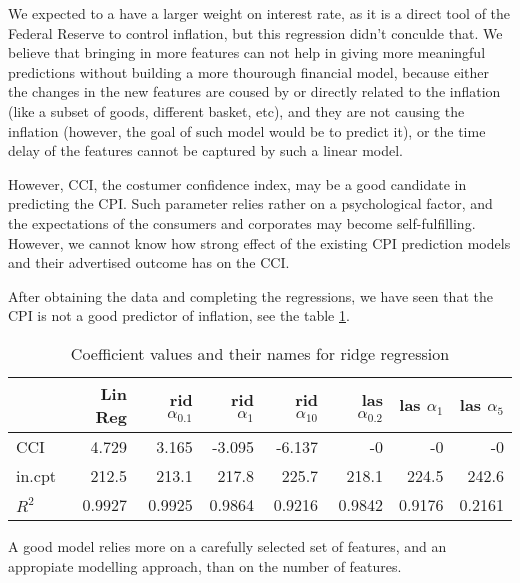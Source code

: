 \documentclass{article}
\begin{document}
We expected to a have a larger weight on interest rate,
as it is a direct tool of the Federal Reserve to control inflation,
but this regression didn't conculde that. We believe that bringing in more features
can not help in giving more meaningful predictions without building a more thourough financial model,
because either the changes in the new features are coused by or directly related to the inflation
(like a subset of goods, different basket, etc),
and they are not causing the inflation (however, the goal of such model would be to predict it),
or the time delay of the features cannot be captured by such a linear model.

However, CCI, the costumer confidence index, may be a good candidate in predicting the CPI.
Such parameter relies rather on a psychological factor,
and the expectations of the consumers and corporates may become self-fulfilling.
However, we cannot know how strong effect of the existing CPI prediction models
and their advertised outcome has on the CCI.

After obtaining the data and completing the regressions,
we have seen that the CPI is not a good predictor of inflation,
see the table \ref{tab:ridge_coefficients_CCI}.
\begin{table}
      \caption{Coefficient values and their names for ridge regression}
      \label{tab:ridge_coefficients_CCI}
      \begin{tabular}{lrrrrrrr}
            \toprule
                   & Lin Reg & rid $\alpha_{0.1}$ & rid $\alpha_{1}$ & rid $\alpha_{10}$ & las $\alpha_{0.2}$ & las $\alpha_{1}$ & las $\alpha_{5}$ \\
            \midrule
            CCI    & 4.729   & 3.165              & -3.095           & -6.137            & -0                 & -0               & -0               \\
            in.cpt & 212.5   & 213.1              & 217.8            & 225.7             & 218.1              & 224.5            & 242.6            \\
            $R^2$  & 0.9927  & 0.9925             & 0.9864           & 0.9216            & 0.9842             & 0.9176           & 0.2161           \\
            \bottomrule
      \end{tabular}
\end{table}

A good model relies more on a carefully selected set of features,
and an appropiate modelling approach, than on the number of features.



\end{document}
